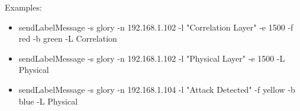 Examples:
\begin{itemize}
\item sendLabelMessage -s glory -n 192.168.1.102 -l "Correlation Layer" -e 1500 -f red -b green -L Correlation
\item sendLabelMessage -s glory -n 192.168.1.102 -l "Physical Layer" -e 1500 -L Physical
\item sendLabelMessage -s glory -n 192.168.1.104 -l "Attack Detected" -f yellow -b blue -L Physical 
\end{itemize}


